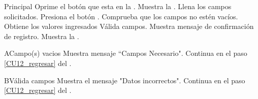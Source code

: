     \begin{UCtrayectoria}{Principal}
    \UCpaso[\UCactor] Oprime el botón  que esta en la .
    \UCpaso Muestra la .
    \UCpaso[\UCactor] Llena los campos solicitados. \label{CU12_regresar}
    \UCpaso[\UCactor] Presiona el botón .
    \UCpaso Comprueba que los campos no estén vacíos. 
    \UCpaso Obtiene los valores ingresados
    \UCpaso Válida campos. 
    \UCpaso Muestra mensaje de confirmación de registro.
    \UCpaso Muestra la .
    \end{UCtrayectoria}
    
    \begin{UCtrayectoriaA}{A}{Campo(s) vacios}
    	\UCpaso Muestra mensaje “Campos Necesario".
    	\UCpaso Continua en el paso \ref{CU12_regresar} del .
    \end{UCtrayectoriaA}

	\begin{UCtrayectoriaA}{B}{Válida campos}
		\UCpaso Muestra el mensaje "Datos incorrectos".
   		\UCpaso Continua en el paso \ref{CU12_regresar} del .
	\end{UCtrayectoriaA}

	


